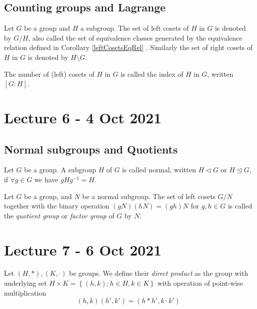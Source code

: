 \documentclass[11pt]{scrartcl}
\begin{document}
\subsection{Counting groups and Lagrange}

\begin{definition}
  Let $G$ be a group and $H$ a subgroup. The set of left cosets of $H$ in $G$ is denoted
  by $G/H$, also called the set of equivalence classes generated by the equivalence
  relation defined in Corollary \ref{leftCosetsEqRel} . Similarly the set of right cosets of
  $H$ in $G$ is denoted by $H\setminus G$.
  \label{cosets}
\end{definition}

\begin{definition}
  The number of (left) cosets of $H$ in $G$ is called the index of $H$ in $G$, written
  $[G:H]$.
\end{definition}

\section{Lecture 6 - 4 Oct 2021}

\subsection{Normal subgroups and Quotients}

\begin{definition}
  Let $G$ be a group. A subgroup $H$ of $G$ is called normal, written $H\triangleleft G$
  or $H\trianglelefteq G$, if $\forall g\in G$ we have $gHg^{-1}=H$.
  \label{normalSubgroup}
\end{definition}

\begin{definition}
  Let $G$ be a group, and $N$ be a normal subgroup. The set of left cosets $G/N$ together
  with the binary operation $(gN)(hN)=(gh)N$ for $g,h\in G$ is called the \emph{quotient
  group} or \emph{factor group} of $G$ by $N$.
  \label{quotientGroup}
\end{definition}

\section{Lecture 7 - 6 Oct 2021}

\begin{definition}
  Let $(H,*),(K,\cdot)$ be groups. We define their \emph{direct product} as the group
  with underlying set $H\times K = \left\{ (h,k) : h\in H, k\in K \right\}$ with operation
  of point-wise multiplication
  \[(h,k)(h',k')=(h*h',k\cdot k')\]
  \label{directProduct}
\end{definition}
\end{document}
